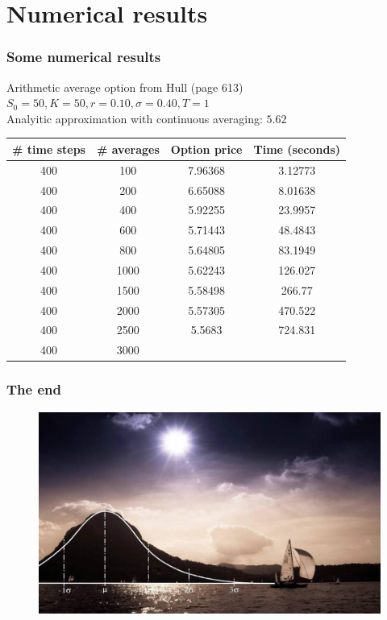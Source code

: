\documentclass{beamer}
\begin{document}
\section{Numerical results}

\begin{frame}
\frametitle{Some numerical results}
\begin{center}
Arithmetic average option from Hull (page 613)\\
$S_0=50, K = 50, r = 0.10, \sigma = 0.40, T = 1$ \\
Analyitic approximation with continuous averaging: $5.62$
\end{center}

\begin{table}
\begin{tabular}{c c c c}
\toprule
\textbf{\# time steps} & \textbf{\# averages} & \textbf{Option price} & \textbf{Time (seconds)}\\
\midrule
400 		& 100 		& 7.96368 		& 3.12773 \\
400 		& 200		& 6.65088 		& 8.01638 \\
400 		& 400 		& 5.92255 		& 23.9957 \\
400 		& 600 		& 5.71443 		& 48.4843 \\
400 		& 800 		& 5.64805 		& 83.1949 \\
400 		& 1000 		& 5.62243 		& 126.027 \\
400 		& 1500 		& 5.58498 		& 266.77  \\
400 		& 2000 		& 5.57305 		& 470.522 \\
400 		& 2500 		& 5.5683 		& 724.831 \\
400 		& 3000 		&  		&  \\
\bottomrule
\end{tabular}
\end{table}
\end{frame}


\begin{frame}
\frametitle{The end}
\begin{figure}
	\includegraphics[scale=0.35]{end}
\end{figure}
\end{frame}

\end{document}
